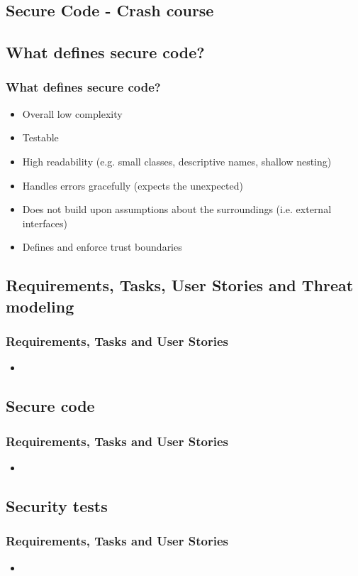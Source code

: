 \documentclass{beamer}
\begin{document}
\begin{frame}
\section{Secure Code - Crash course}

\subsection{What defines secure code?}
\begin{frame}
\frametitle{What defines secure code?}
\begin{itemize}
  \item Overall low complexity
  \item Testable
  \item High readability (e.g. small classes, descriptive names, shallow nesting)
  \item Handles errors gracefully (expects the unexpected)
  \item Does not build upon assumptions about the surroundings (i.e. external interfaces)
  \item Defines and enforce trust boundaries
\end{itemize}
\end{frame}

\subsection{Requirements, Tasks, User Stories and Threat modeling}
\begin{frame}
\frametitle{Requirements, Tasks and User Stories}
\begin{itemize}
\item
\end{itemize}
\end{frame}

\subsection{Secure code}
\begin{frame}
\frametitle{Requirements, Tasks and User Stories}
\begin{itemize}
\item
\end{itemize}
\end{frame}

\subsection{Security tests}
\begin{frame}
\frametitle{Requirements, Tasks and User Stories}
\begin{itemize}
\item
\end{itemize}
\end{frame}


\end{frame}
\end{document}
